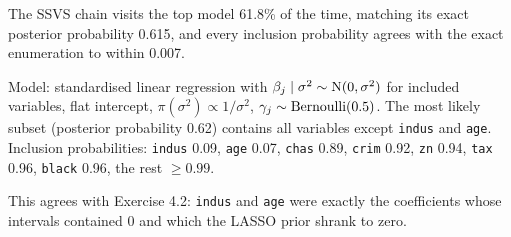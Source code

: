\documentclass[11pt]{article}
\begin{document}
\begin{sanity}
The SSVS chain visits the top model 61.8\% of the time, matching its exact posterior probability 0.615, and every inclusion probability agrees with the exact enumeration to within 0.007. \checkmark
\end{sanity}

\begin{answer}
Model: standardised linear regression with $\beta_j\mid\sigma^2\sim\mathrm{N}(0,\sigma^2)$ for included variables, flat intercept, $\pi(\sigma^2)\propto1/\sigma^2$, $\gamma_j\sim\mathrm{Bernoulli}(0.5)$. The most likely subset (posterior probability 0.62) contains all variables except \texttt{indus} and \texttt{age}. Inclusion probabilities: \texttt{indus} 0.09, \texttt{age} 0.07, \texttt{chas} 0.89, \texttt{crim} 0.92, \texttt{zn} 0.94, \texttt{tax} 0.96, \texttt{black} 0.96, the rest $\ge0.99$.
\end{answer}

\begin{takeaway}
This agrees with Exercise 4.2: \texttt{indus} and \texttt{age} were exactly the coefficients whose intervals contained 0 and which the LASSO prior shrank to zero.
\end{takeaway}
\end{document}
